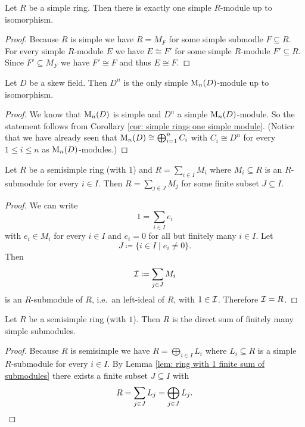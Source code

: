 \begin{cor}\label{cor: simple rings one simple module}
  Let $R$ be a simple ring.
  Then there is exactly one simple $R$-module up to isomorphism.
\end{cor}
\begin{proof}
  Because $R$ is simple we have $R = M_F$ for some simple submodle $F \subseteq R$.
  For every simple $R$-module $E$ we have $E \cong F'$ for some simple $R$-module $F' \subseteq R$.
  Since $F' \subseteq M_F$ we have $F' \cong F$ and thus $E \cong F$.
\end{proof}


\begin{cor}\label{cor: D^n only simple M_n(D)-module}
  Let $D$ be a skew field.
  Then $D^n$ is the only simple $\operatorname{M}_n(D)$-module up to isomorphism.
\end{cor}
\begin{proof}
  We know that $\operatorname{M}_n(D)$ is simple and $D^n$ a simple $\operatorname{M}_n(D)$-module.
  So the statement follows from Corollary \ref{cor: simple rings one simple module}.
  (Notice that we have already seen that $\operatorname{M}_n(D) \cong \bigoplus_{i=1}^n C_i$ with $C_i \cong D^n$ for every $1 \leq i \leq n$ as $\operatorname{M}_n(D)$-modules.)
\end{proof}


\begin{lem}\label{lem: ring with 1 finite sum of submodules}
  Let $R$ be a semisimple ring (with $1$) and $R = \sum_{i \in I} M_i$ where $M_i \subseteq R$ is an $R$-submodule for every $i \in I$.
  Then $R = \sum_{j \in J} M_j$ for some finite subset $J \subseteq I$.
\end{lem}
\begin{proof}
  We can write
  \[
      1
    = \sum_{i \in I} e_i
  \]
  with $e_i \in M_i$ for every $i \in I$ and $e_i = 0$ for all but finitely many $i \in I$. Let
  \[
              J
    \coloneqq \{i \in I \mid e_i \neq 0\}.
  \]
  Then
  \[
              \mathcal{I}
    \coloneqq \sum_{j \in J} M_i
  \]
  is an $R$-submodule of $R$, i.e.\ an left-ideal of $R$, with $1 \in \mathcal{I}$.
  Therefore $\mathcal{I} = R$.
\end{proof}


\begin{cor}\label{lem: semisimple ring with 1 only finitely many summands}
  Let $R$ be a semisimple ring (with $1$).
  Then $R$ is the direct sum of finitely many simple submodules.
\end{cor}
\begin{proof}
  Because $R$ is semisimple we have $R = \bigoplus_{i \in I} L_i$ where $L_i \subseteq R$ is a simple $R$-submodule for every $i \in I$.
  By Lemma \ref{lem: ring with 1 finite sum of submodules} there exists a finite subset $J \subseteq I$ with
  \[
      R
    = \sum_{j \in J} L_j
    = \bigoplus_{j \in J} L_j.
    \qedhere
  \]
\end{proof}





